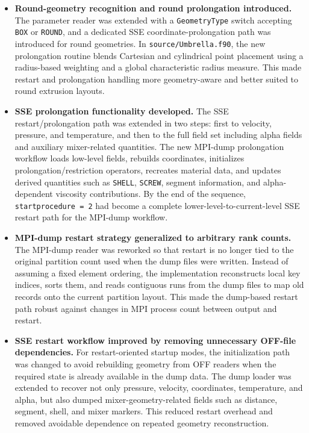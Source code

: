 \documentclass[11pt,a4paper]{article}
\begin{document}
\begin{itemize}[leftmargin=*,itemsep=0.9em]
  \item \textbf{Round-geometry recognition and round prolongation introduced.}
  The parameter reader was extended with a \texttt{GeometryType} switch accepting \texttt{BOX} or \texttt{ROUND}, and a dedicated SSE coordinate-prolongation path was introduced for round geometries. In \texttt{source/Umbrella.f90}, the new prolongation routine blends Cartesian and cylindrical point placement using a radius-based weighting and a global characteristic radius measure. This made restart and prolongation handling more geometry-aware and better suited to round extrusion layouts.

  \item \textbf{SSE prolongation functionality developed.}
  The SSE restart/prolongation path was extended in two steps: first to velocity, pressure, and temperature, and then to the full field set including alpha fields and auxiliary mixer-related quantities. The new MPI-dump prolongation workflow loads low-level fields, rebuilds coordinates, initializes prolongation/restriction operators, recreates material data, and updates derived quantities such as \texttt{SHELL}, \texttt{SCREW}, segment information, and alpha-dependent viscosity contributions. By the end of the sequence, \texttt{startprocedure = 2} had become a complete lower-level-to-current-level SSE restart path for the MPI-dump workflow.

  \item \textbf{MPI-dump restart strategy generalized to arbitrary rank counts.}
  The MPI-dump reader was reworked so that restart is no longer tied to the original partition count used when the dump files were written. Instead of assuming a fixed element ordering, the implementation reconstructs local key indices, sorts them, and reads contiguous runs from the dump files to map old records onto the current partition layout. This made the dump-based restart path robust against changes in MPI process count between output and restart.

  \item \textbf{SSE restart workflow improved by removing unnecessary OFF-file dependencies.}
  For restart-oriented startup modes, the initialization path was changed to avoid rebuilding geometry from OFF readers when the required state is already available in the dump data. The dump loader was extended to recover not only pressure, velocity, coordinates, temperature, and alpha, but also dumped mixer-geometry-related fields such as distance, segment, shell, and mixer markers. This reduced restart overhead and removed avoidable dependence on repeated geometry reconstruction.


\end{itemize}
\end{document}
